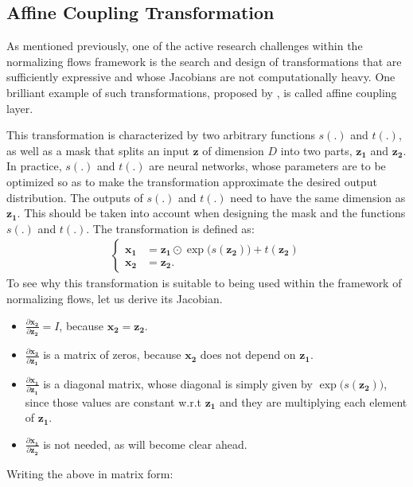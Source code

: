 \subsection{Affine Coupling Transformation}
As mentioned previously, one of the active research challenges within the
normalizing flows framework is the search and design of transformations that
are sufficiently expressive and whose Jacobians are not computationally heavy. One brilliant
example of such transformations, proposed by \textcite{real-nvp}, is
called affine coupling layer.

This transformation is characterized by two arbitrary functions $s(.)$ and
$t(.)$, as well as a mask that splits an input $\bm{z}$ of dimension $D$ into
two parts, $\bm{z_1}$ and $\bm{z_2}$. In practice, $s(.)$ and $t(.)$ are neural
networks, whose parameters are to be optimized so as to make the transformation
approximate the desired output distribution. The outputs of $s(.)$ and $t(.)$
need to have the same dimension as $\bm{z_1}$. This should be taken into account when
designing the mask and the functions $s(.)$ and $t(.)$. The transformation is defined as:
\begin{align}
    \begin{cases}
    \bm{x_1} &= \bm{z_1} \odot \exp\big(s(\bm{z_2})\big) + t(\bm{z_2}) \\
    \bm{x_2} &= \bm{z_2}.
    \end{cases}
\end{align}
To see why this transformation is suitable to being used within the framework
of normalizing flows, let us derive its Jacobian.
\begin{itemize}
    \item $\frac{\partial \bm{x_2}}{\partial \bm{z_2}} = I$, because $\bm{x_2} = \bm{z_2}$.
    \item $\frac{\partial \bm{x_2}}{\partial \bm{z_1}}$ is a matrix of zeros, because $\bm{x_2}$ does not depend on $\bm{z_1}$.
    \item $\frac{\partial \bm{x_1}}{\partial \bm{z_1}}$ is a diagonal matrix,
        whose diagonal is simply given by $\exp\big(s(\bm{z_2})\big)$, since those values are
        constant w.r.t $\bm{z_1}$ and they are multiplying each element of $\bm{z_1}$.
    \item $\frac{\partial \bm{x_1}}{\partial \bm{z_2}}$ is not needed,
        as will become clear ahead.
\end{itemize}

Writing the above in matrix form:


